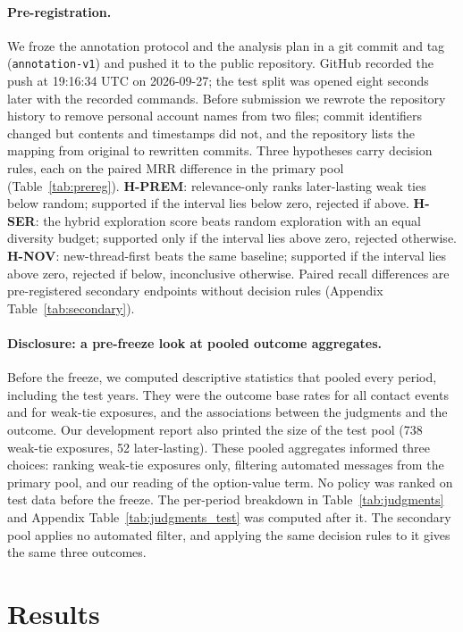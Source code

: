 \documentclass[11pt]{article}
\begin{document}
\paragraph{Pre-registration.} We froze the annotation protocol and the analysis plan in a git commit and tag (\texttt{annotation-v1}) and pushed it to the public repository. GitHub recorded the push at 19:16:34 UTC on 2026-09-27; the test split was opened eight seconds later with the recorded commands. Before submission we rewrote the repository history to remove personal account names from two files; commit identifiers changed but contents and timestamps did not, and the repository lists the mapping from original to rewritten commits. Three hypotheses carry decision rules, each on the paired MRR difference in the primary pool (Table~\ref{tab:prereg}). \textbf{H-PREM}: relevance-only ranks later-lasting weak ties below random; supported if the interval lies below zero, rejected if above. \textbf{H-SER}: the hybrid exploration score beats random exploration with an equal diversity budget; supported only if the interval lies above zero, rejected otherwise. \textbf{H-NOV}: new-thread-first beats the same baseline; supported if the interval lies above zero, rejected if below, inconclusive otherwise. Paired recall differences are pre-registered secondary endpoints without decision rules (Appendix Table~\ref{tab:secondary}).

\paragraph{Disclosure: a pre-freeze look at pooled outcome aggregates.} Before the freeze, we computed descriptive statistics that pooled every period, including the test years. They were the outcome base rates for all contact events and for weak-tie exposures, and the associations between the judgments and the outcome. Our development report also printed the size of the test pool (738 weak-tie exposures, 52 later-lasting). These pooled aggregates informed three choices: ranking weak-tie exposures only, filtering automated messages from the primary pool, and our reading of the option-value term. No policy was ranked on test data before the freeze. The per-period breakdown in Table~\ref{tab:judgments} and Appendix Table~\ref{tab:judgments_test} was computed after it. The secondary pool applies no automated filter, and applying the same decision rules to it gives the same three outcomes.

\section{Results}
\label{sec:results}
\end{document}
